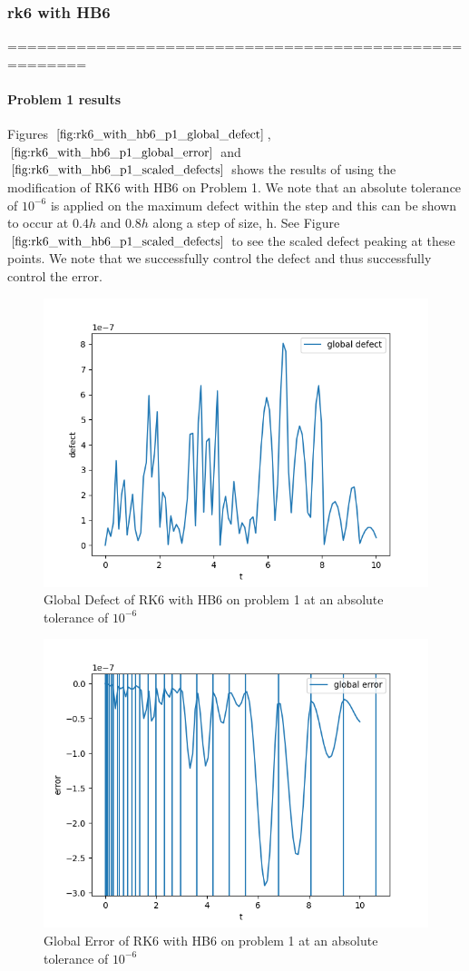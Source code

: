 \documentclass{article}
\begin{document}
\subsubsection{rk6 with HB6}
======================================================
\paragraph{Problem 1 results}
Figures $\ref{fig:rk6_with_hb6_p1_global_defect}$, $\ref{fig:rk6_with_hb6_p1_global_error}$ and $\ref{fig:rk6_with_hb6_p1_scaled_defects}$ shows the results of using the modification of RK6 with HB6 on Problem 1. We note that an absolute tolerance of $10^{-6}$ is applied on the maximum defect within the step and this can be shown to occur at $0.4h$ and $0.8h$ along a step of size, h. See Figure $\ref{fig:rk6_with_hb6_p1_scaled_defects}$ to see the scaled defect peaking at these points. We note that we successfully control the defect and thus successfully control the error.

\begin{figure}[H]
\centering
\includegraphics[width=0.7\linewidth]{./figures/rk6_with_hb6_p1_global_defect}
\caption{Global Defect of RK6 with HB6 on problem 1 at an absolute tolerance of $10^{-6}$}
\label{fig:rk6_with_hb6_p1_global_defect}
\end{figure}

\begin{figure}[H]
\centering
\includegraphics[width=0.7\linewidth]{./figures/rk6_with_hb6_p1_global_error}
\caption{Global Error of RK6 with HB6 on problem 1 at an absolute tolerance of $10^{-6}$}
\label{fig:rk6_with_hb6_p1_global_error}
\end{figure}
\end{document}
